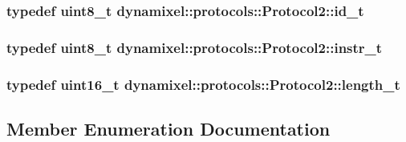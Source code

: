 \subsubsection[{id\+\_\+t}]{\setlength{\rightskip}{0pt plus 5cm}typedef uint8\+\_\+t {\bf dynamixel\+::protocols\+::\+Protocol2\+::id\+\_\+t}}\label{classdynamixel_1_1protocols_1_1_protocol2_a38d9cae72cd86213cca74e718c240429}
\hypertarget{classdynamixel_1_1protocols_1_1_protocol2_aa7302f20356607bd51e4d4ecf4cb7abf}{}
\subsubsection[{instr\+\_\+t}]{\setlength{\rightskip}{0pt plus 5cm}typedef uint8\+\_\+t {\bf dynamixel\+::protocols\+::\+Protocol2\+::instr\+\_\+t}}\label{classdynamixel_1_1protocols_1_1_protocol2_aa7302f20356607bd51e4d4ecf4cb7abf}
\hypertarget{classdynamixel_1_1protocols_1_1_protocol2_a962ea2a3d9aa7e6ca7cee3e0c38ce383}{}
\subsubsection[{length\+\_\+t}]{\setlength{\rightskip}{0pt plus 5cm}typedef uint16\+\_\+t {\bf dynamixel\+::protocols\+::\+Protocol2\+::length\+\_\+t}}\label{classdynamixel_1_1protocols_1_1_protocol2_a962ea2a3d9aa7e6ca7cee3e0c38ce383}


\subsection{Member Enumeration Documentation}
\hypertarget{classdynamixel_1_1protocols_1_1_protocol2_ab779d109a8aeea8e2de436f6d23b43ed}{}

